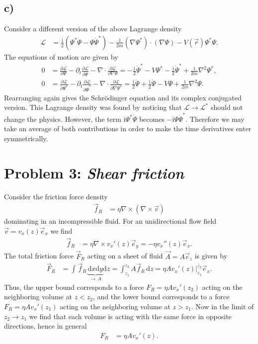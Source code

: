 \documentclass[english, parskip=full]{scrartcl}
\newcommand{\intx}{}
\newcommand{\kla}{}
\newcommand{\tecxt}{}
\renewcommand{\i}{\text{i}}
\begin{document}
\subsection*{c)}
Consider a different version of the above Lagrange density
\begin{align}
\mathcal{L} &= \frac{\i}{2}\kla\left( {\Psi^\ast\dot{\Psi} - \Psi\dot{\Psi}^\ast} \right) - \frac{1}{2m} (\nabla\Psi^\ast) \cdot (\nabla\Psi) - V(\vec{r}) \Psi^\ast\Psi.
\end{align}
The equations of motion are given by
\begin{align}
0 &= \frac{\partial\mathcal{L}}{\partial\Psi} - \partial_t \frac{\partial\mathcal{L}}{\partial \dot{\Psi}} - \nabla \cdot \frac{\partial\mathcal{L}}{\partial \nabla\Psi} = -\frac{\i}{2}\dot{\Psi}^\ast - V\Psi^\ast - \frac{\i}{2} \dot{\Psi}^\ast + \frac{1}{2m}\nabla^2\Psi^\ast,\\
0 &= \frac{\partial\mathcal{L}}{\partial\Psi^\ast} - \partial_t \frac{\partial\mathcal{L}}{\partial \dot{\Psi}^\ast} - \nabla \cdot \frac{\partial\mathcal{L}}{\partial \nabla\Psi^\ast} = \frac{\i}{2} \dot{\Psi} + \frac{\i}{2}\dot{\Psi} - V\Psi + \frac{1}{2m}\nabla^2\Psi.
\end{align}
Rearranging again gives the Schrödinger equation and its complex conjugated version.
This Lagrange density was found by noticing that $\mathcal{L} \rightarrow \mathcal{L}^\ast$ should not change the physics.
However, the term $\i\Psi^\ast\dot{\Psi}$ becomes $-\i\Psi \dot{\Psi}^\ast$.
Therefore we may take an average of both contributions in order to make the time derivatives enter symmetrically.

\section*{Problem 3: \normalfont\textit{\large{Shear friction}}}
Consider the friction force density
\begin{align}
\vec{f}_R &= \eta \nabla\times \kla\left( {\nabla\times \vec{v}} \right)
\end{align}
dominating in an incompressible fluid.
For an unidirectional flow field $\vec{v} = v_x(z)\vec{e}_x$ we find
\begin{align}
\vec{f}_R &= \eta \nabla\times v_x'(z)\vec{e}_y = -\eta v_x''(z)\vec{e}_x.
\end{align}
The total friction force $\vec{F}_R$ acting on a sheet of fluid $\vec{A}=A\vec{e}_z$ is given by
\begin{align}
\vec{F}_R &= \intx\int_{ }^{ }\vec{f}_R\, \underbrace{\mathrm{d}x \tecxt\text{d}y}_{\rightarrow\, A} \tecxt\text{d}z = \intx\int_{z_1}^{z_2} A\vec{f}_R \,\mathrm{d}z = \eta A v_x'(z)\Big\vert_{z_1}^{z_2} \vec{e}_x.
\end{align}
Thus, the upper bound corresponds to a force $F_R = \eta A v_x'(z_2)$ acting on the neighboring volume at $z<z_2$, and the lower bound corresponds to a force $F_R = \eta A v_x'(z_1)$ acting on the neighboring volume at $z > z_1$.
Now in the limit of $z_2\rightarrow z_1$ we find that each volume is acting with the same force in opposite directions, hence in general 
\begin{align}
F_R &= \eta A v_x'(z).
\end{align}
\end{document}
